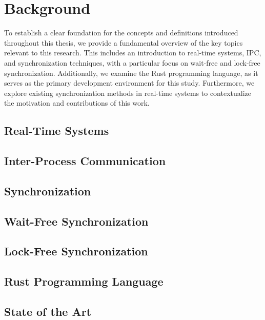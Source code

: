 \chapter{Background}

To establish a clear foundation for the concepts and definitions introduced throughout this thesis, we provide a fundamental overview of the key topics relevant to this research. This includes an introduction to real-time systems, \acf{IPC}, and synchronization techniques, with a particular focus on wait-free and lock-free synchronization. Additionally, we examine the Rust programming language, as it serves as the primary development environment for this study. Furthermore, we explore existing synchronization methods in real-time systems to contextualize the motivation and contributions of this work.

\section{Real-Time Systems}

\section{Inter-Process Communication}

\section{Synchronization}

\section{Wait-Free Synchronization}

\section{Lock-Free Synchronization}

\section{Rust Programming Language}

\section{State of the Art}